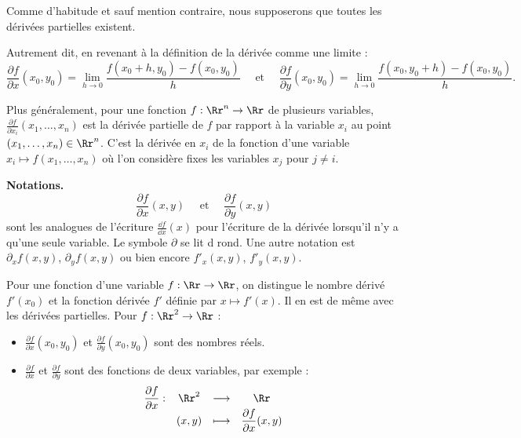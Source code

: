\documentclass[11pt,class=report,crop=false]{standalone}
\begin{document}
Comme d'habitude et sauf mention contraire, nous supposerons que toutes les dérivées partielles existent.

Autrement dit, en revenant à la définition de la dérivée comme une limite :
 $$\frac{\partial f}{\partial x} (x_0,y_0) = \lim_{h \rightarrow 0} 
 \frac{f(x_0+h, y_0) - f(x_0,y_0)}{h}
\quad \text{ et } \quad 
\frac{\partial f}{\partial y} (x_0,y_0) = \lim_{h \rightarrow 0} 
 \frac{f(x_0, y_0+h) - f(x_0,y_0)}{h}.$$




Plus généralement, pour une fonction $f : \Rr^n \to \Rr$ de plusieurs variables,
$\frac{\partial f}{\partial x_i} (x_1,\ldots,x_n)$ est la dérivée partielle de $f$ par rapport à la variable $x_i$ au point $(x_1,\ldots,x_n) \in \Rr^n$.
C'est la dérivée en $x_i$ de la fonction d'une variable $x_i \mapsto f(x_1,\ldots,x_n)$ où l'on considère fixes les variables $x_j$ pour $j \neq i$.

\bigskip

\textbf{Notations.}
$$\frac{\partial f}{\partial x} (x,y) \quad \text{ et } \quad \frac{\partial f}{\partial y} (x,y)$$
sont les analogues de l'écriture $\frac{\dd f}{\dd x}(x)$ pour l'écriture de la dérivée lorsqu'il n'y a qu'une seule variable.
Le symbole \og{}$\partial$\fg{} se lit \og{}d rond\fg{}.
Une autre notation est $\partial_x f(x,y)$, $\partial_y f(x,y)$ ou bien encore $f'_x (x,y)$, $f'_y (x,y)$.




\bigskip

\begin{remarque*}
Pour une fonction d'une variable $f : \Rr \to \Rr$,
on distingue le nombre dérivé $f'(x_0)$ et la fonction dérivée $f'$ définie par $x \mapsto f'(x)$. Il en est de même avec les dérivées partielles. Pour $f : \Rr^2 \to \Rr$ :
\begin{itemize}
  \item $\displaystyle \frac{\partial f}{\partial x} (x_0,y_0)$ et $\displaystyle \frac{\partial f}{\partial y} (x_0,y_0)$
  sont des nombres réels.
  
  \item $\displaystyle \frac{\partial f}{\partial x}$ et $\displaystyle \frac{\partial f}{\partial y}$ sont des fonctions de deux variables, par exemple :
$$\begin{array}{cccc}
 \dfrac{\partial f}{\partial x} : & \Rr^2 & \longrightarrow & \Rr \\
                                 & (x,y) & \longmapsto & \dfrac{\partial f}{\partial x} (x,y)
\end{array}$$
\end{itemize}
\end{remarque*}
\end{document}
